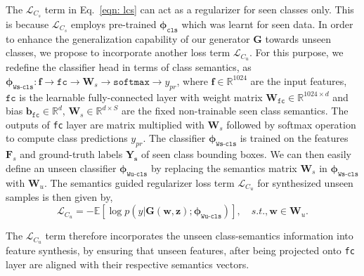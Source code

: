 \documentclass[runningheads]{llncs}
\begin{document}
The $\mathcal{L}_{C_s}$ term in Eq.~\ref{eqn: lcs} can act as a regularizer for seen classes only. This is because $\mathcal{L}_{C_s}$ employs pre-trained $\mathbf{\phi}_{\texttt{cls}}$ which was learnt for seen data. In order to enhance the generalization capability of our generator $\mathbf{G}$ towards unseen classes, we propose to incorporate another loss term $\mathcal{L}_{C_u}$.
For this purpose, we redefine the classifier head in terms of class semantics, as $\mathbf{\phi}_{\texttt{Ws-cls}}: \mathbf{f} \xrightarrow{} \texttt{fc} \xrightarrow{} \mathbf{W}_s \xrightarrow{} \texttt{softmax} \xrightarrow{} y_{pr}$, where $\mathbf{f} \in \mathbb{R}^{1024}$ are the input features, $\texttt{fc}$ is the learnable fully-connected layer with weight matrix $\mathbf{W}_{\texttt{fc}} \in \mathbb{R}^{1024 \times d}$ and bias $\mathbf{b}_{\texttt{fc}} \in \mathbb{R}^{d}$, $\mathbf{W}_s \in \mathbb{R}^{d\times S}$ are the fixed non-trainable seen class semantics. The outputs of \texttt{fc} layer are matrix multiplied with $\mathbf{W}_s$ followed by softmax operation to compute class predictions $y_{pr}$. The classifier $\mathbf{\phi}_{\texttt{Ws-cls}}$ is trained on the features $\mathbf{F}_s$ and ground-truth labels $\mathbf{Y_s}$ of seen class bounding boxes. We can then easily define an unseen classifier $\mathbf{\phi}_{\texttt{Wu-cls}}$ by replacing the semantics matrix $\mathbf{W}_s$ in $\mathbf{\phi}_{\texttt{Ws-cls}}$  with $\mathbf{W}_u$.
The semantics guided regularizer loss term $\mathcal{L}_{C_u}$ for synthesized unseen samples is then given by,
\begin{equation}
    \mathcal{L}_{C_u} = - \mathbb{E}[\log p(y|\mathbf{G}(\mathbf{w},\mathbf{z}); \mathbf{\phi}_{\texttt{Wu-cls}})], \quad s.t., \mathbf{w} \in \mathbf{W}_u.
\end{equation}

The $\mathcal{L}_{C_u}$ term therefore incorporates the unseen class-semantics information into feature synthesis, by ensuring that unseen features, after being projected onto \texttt{fc} layer are aligned with their respective semantics vectors.
\end{document}
